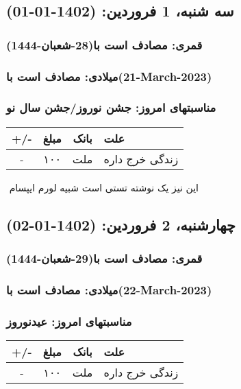 \documentclass{article}
\newcommand{\rnote}[1]{\marginpar{\textcolor{color}{\StrSubstitute{\##1}{ }{\_}}}}
\newcommand{\myRow}[4]{
    #1 & #2 & #3 & #4 \\ \hline
}
\begin{document}
\newpage
{}
\textcolor{color}{
\section{ سه شنبه، 1 فروردین: (1402-01-01) }
\subsubsection*{قمری: مصادف است با(28-شعبان-1444)} 
\subsubsection*{میلادی: مصادف است با(21-March-2023)}
\subsubsection*{مناسبتهای امروز: جشن نوروز/جشن سال نو}
}


\begin{tabular}{ | c | c | c | p{5cm} |}
    \hline
    \myRow{ +/- }{مبلغ}{بانک}{علت}
    \myRow{-}{۱۰۰}{ملت}{زندگی خرج داره}
\end{tabular}
\newline
\newline

‌
\rnote{تست}
این نیز یک نوشته تستی است شبیه لورم ایپسام




\newpage
{}
\textcolor{color}{
\section{ چهارشنبه، 2 فروردین: (1402-01-02) }
\subsubsection*{قمری: مصادف است با(29-شعبان-1444)} 
\subsubsection*{میلادی: مصادف است با(22-March-2023)}
\subsubsection*{مناسبتهای امروز: عیدنوروز}
}


\begin{tabular}{ | c | c | c | p{5cm} |}
    \hline
    \myRow{ +/- }{مبلغ}{بانک}{علت}
    \myRow{-}{۱۰۰}{ملت}{زندگی خرج داره}
\end{tabular}
\newline
\newline
\end{document}
